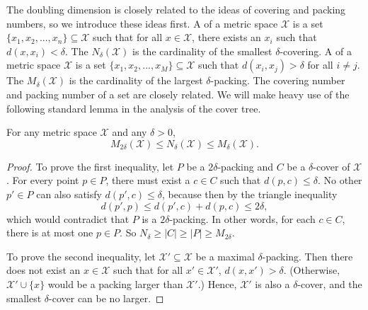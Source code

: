 \documentclass[thesis.tex]{subfiles}
\newcommand{\set}[1]{\mathcal {#1}}
\newcommand{\dist}[2]{\distf({#1},{#2})}
\newcommand{\distf}{d}
\begin{document}
The doubling dimension is closely related to the ideas of covering and packing numbers,
so we introduce these ideas first.
A  of a metric space $\set X$ is a set $\{x_1,x_2,...,x_n\} \subseteq \set X$ such that for all $x\in\set X$, there exists an $x_i$ such that $\dist{x}{x_i} < \delta$.
The  $N_\delta(\set X)$ is the cardinality of the smallest $\delta$-covering.
A  of a metric space $\set X$ is a set $\{x_1,x_2,...,x_M\} \subseteq \set X$ such that $\dist{x_i}{x_j} > \delta$ for all $i \ne j$.
The  $M_\delta (\set X)$ is the cardinality of the largest $\delta$-packing.
The covering number and packing number of a set are closely related.
We will make heavy use of the following standard lemma in the analysis of the cover tree.

\begin{lemma}
    \label{lemma:coverpacking}
    For any metric space $\set X$ and any $\delta>0$,
    \begin{equation}
        M_{2\delta}(\set X) \le N_\delta(\set X) \le M_{\delta}(\set X)
        .
    \end{equation}
\end{lemma}
\begin{proof}
    To prove the first inequality, let $P$ be a $2\delta$-packing and $C$ be a $\delta$-cover of $\set X$.
    For every point $p\in P$, there must exist a $c\in C$ such that $\dist{p}{c}\le\delta$.
    No other $p'\in P$ can also satisfy $\dist{p'}{c}\le\delta$, because then by the triangle inequality
    \begin{equation}
        \dist{p'}{p} \le \dist{p'}{c}+\dist{p}{c} \le 2\delta
        ,
    \end{equation}
    which would contradict that $P$ is a $2\delta$-packing.
    In other words, for each $c\in C$, there is at most one $p\in P$.
    So $N_\delta \ge |C| \ge |P| \ge M_{2\delta}$.

    To prove the second inequality, let $\set X'\subseteq \set X$ be a maximal $\delta$-packing.
    Then there does not exist an $x\in\set X$ such that for all $x'\in\set X'$, 
    $\dist{x}{x'} > \delta$.
    (Otherwise, $\set X' \cup \{x\}$ would be a packing larger than $\set X'$.)
    Hence, $\set X'$ is also a $\delta$-cover,
    and the smallest $\delta$-cover can be no larger.
\end{proof}
\end{document}
